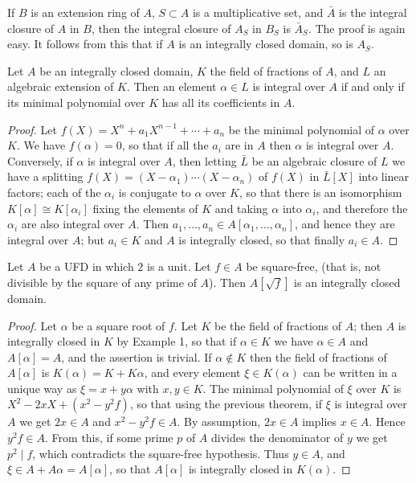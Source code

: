 \begin{example}\label{ex:9.3}
If $B$ is an extension ring of $A$, $S \subset A$ is a multiplicative set, and $\bar{A}$
is the integral closure of $A$ in $B$, then the integral closure of $A_S$ in $B_S$ is $\bar{A}_S$.
The proof is again easy. It follows from this that if $A$ is an integrally closed
domain, so is $A_S$.
\end{example}

\begin{theorem}\label{thm:9.2}
Let $A$ be an integrally closed domain, $K$ the field of fractions
of $A$, and $L$ an algebraic extension of $K$. Then an element $\alpha \in L$ is integral
over $A$ if and only if its minimal polynomial over $K$ has all its coefficients
in $A$.
\end{theorem}

\begin{proof}
Let $f(X) = X^n + a_1X^{n-1} + \cdots + a_n$ be the minimal polynomial of $\alpha$
over $K$. We have $f(\alpha) = 0$, so that if all the $a_i$ are in $A$ then $\alpha$ is integral over
$A$. Conversely, if $\alpha$ is integral over $A$, then letting $\bar{L}$ be an algebraic closure of
$L$ we have a splitting $f(X) = (X - \alpha_1) \cdots (X - \alpha_n)$ of $f(X)$ in $\bar{L}[X]$ into linear
factors; each of the $\alpha_i$ is conjugate to $\alpha$ over $K$, so that there is an
isomorphism $K[\alpha] \cong K[\alpha_i]$ fixing the elements of $K$ and taking $\alpha$ into $\alpha_i$,
and therefore the $\alpha_i$ are also integral over $A$. Then $a_1, \ldots, a_n \in A[\alpha_1, \ldots, \alpha_n]$,
and hence they are integral over $A$; but $a_i \in K$ and $A$ is integrally closed,
so that finally $a_i \in A$.
\end{proof}

\begin{example}\label{ex:9.4}
Let $A$ be a UFD in which $2$ is a unit. Let $f \in A$ be square-free,
(that is, not divisible by the square of any prime of $A$). Then $A[\sqrt{f}]$ is an
integrally closed domain.
\end{example}

\begin{proof}
Let $\alpha$ be a square root of $f$. Let $K$ be the field of fractions of $A$; then
$A$ is integrally closed in $K$ by Example 1, so that if $\alpha \in K$ we have $\alpha \in A$ and
$A[\alpha] = A$, and the assertion is trivial. If $\alpha \notin K$ then the field of fractions of
$A[\alpha]$ is $K(\alpha) = K + K\alpha$, and every element $\xi \in K(\alpha)$ can be written in a
unique way as $\xi = x + y\alpha$ with $x, y \in K$. The minimal polynomial of $\xi$ over $K$
is $X^2 - 2xX + (x^2 - y^2f)$, so that using the previous theorem, if $\xi$ is integral
over $A$ we get $2x \in A$ and $x^2 - y^2f \in A$. By assumption, $2x \in A$ implies $x \in A$.
Hence $y^2f \in A$. From this, if some prime $p$ of $A$ divides the denominator of $y$
we get $p^2 \mid f$, which contradicts the square-free hypothesis. Thus $y \in A$, and
$\xi \in A + A\alpha = A[\alpha]$, so that $A[\alpha]$ is integrally closed in $K(\alpha)$.
\end{proof}

